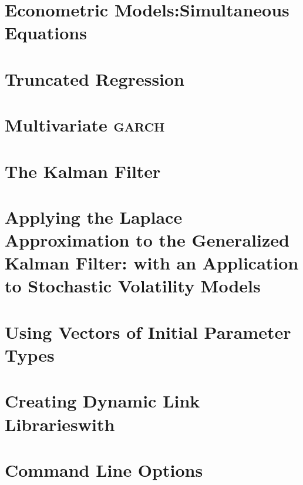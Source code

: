 \documentclass{admbmanual}
\begin{document}
\chapter{Econometric Models:\br Simultaneous Equations}
 \x

\chapter{Truncated Regression}

\chapter{Multivariate \textsc{garch}}

\chapter{The Kalman Filter}
 \x

\chapter{Applying the Laplace Approximation\br
  to the Generalized Kalman Filter:\br
  with an Application to Stochastic Volatility Models}
 \x

\chapter{Using Vectors of Initial Parameter Types}
 \x

\chapter{Creating Dynamic Link Libraries\br with \ADM}

\chapter{Command Line Options}
 \x

%
\end{document}
